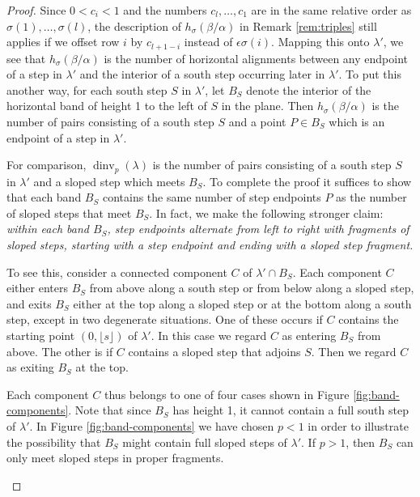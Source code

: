 \documentclass[12pt]{amsart}
\theoremstyle{definition}
\theoremstyle{remark}
\DeclareMathOperator{\dinv}{dinv}
\begin{document}
\begin{proof}
Since $0<c_{i}<1$ and the numbers $c_{l},\ldots,c_{1}$ are in the same
relative order as $\sigma (1),\ldots,\sigma (l)$, the description of
$h_{\sigma }(\beta /\alpha )$ in Remark \ref{rem:triples} still
applies if we offset row $i$ by $c_{l+1-i}$ instead of $\epsilon
\sigma (i)$.  Mapping this onto $\lambda '$, we see that $h_{\sigma
}(\beta /\alpha )$ is the number of horizontal alignments between any
endpoint of a step in $\lambda '$ and the interior of a south step
occurring later in $\lambda '$.  To put this another way, for each
south step $S$ in $\lambda '$, let $B_{S}$ denote the interior of the
horizontal band of height 1 to the left of $S$ in the plane.  Then
$h_{\sigma }(\beta /\alpha )$ is the number of pairs consisting of a
south step $S$ and a point $P\in B_{S}$ which is an endpoint of a step
in $\lambda '$.

For comparison, $\dinv _{p}(\lambda )$ is the number of pairs
consisting of a south step $S$ in $\lambda '$ and a sloped step which
meets $B_{S}$.  To complete the proof it suffices to show that each
band $B_{S}$ contains the same number of step endpoints $P$ as the
number of sloped steps that meet $B_{S}$.  In fact, we make the
following stronger claim: {\em within each band $B_{S}$, step
endpoints alternate from left to right with fragments of sloped steps,
starting with a step endpoint and ending with a sloped step fragment.}

To see this, consider a connected component $C$ of $\lambda '\cap
B_{S}$.  Each component $C$ either enters $B_{S}$ from above along a
south step or from below along a sloped step, and exits $B_{S}$ either
at the top along a sloped step or at the bottom along a south step,
except in two degenerate situations.  One of these occurs if $C$
contains the starting point $(0,\lfloor s \rfloor)$ of $\lambda '$.
In this case we regard $C$ as entering $B_{S}$ from above.  The other
is if $C$ contains a sloped step that adjoins $S$.  Then we regard $C$
as exiting $B_{S}$ at the top.

Each component $C$ thus belongs to one of four cases shown in Figure
\ref{fig:band-components}.  Note that since $B_{S}$ has height 1, it
cannot contain a full south step of $\lambda '$.  In Figure
\ref{fig:band-components} we have chosen $p<1$ in order to illustrate
the possibility that $B_{S}$ might contain full sloped steps of
$\lambda '$.  If $p>1$, then $B_{S}$ can only meet sloped steps in
proper fragments.

\begin{figure}
\end{figure}
\end{proof}
\end{document}
